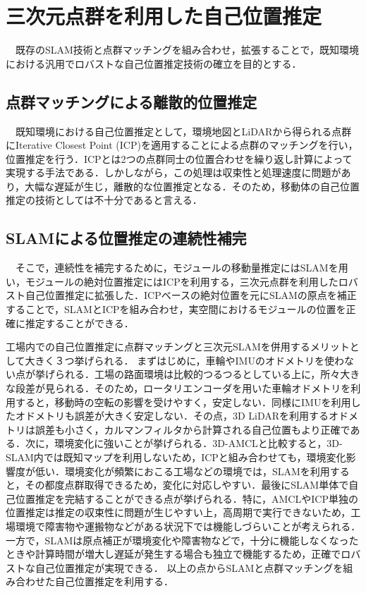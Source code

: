 \section{三次元点群を利用した自己位置推定}
\label{sec:self_position}
　既存のSLAM技術\cite{6DSLAM_outside, 3D_SLAM_outside, EKF_SLAM, FAST-LIO, FAST-LIO2}と点群マッチングを組み合わせ，拡張することで，既知環境における汎用でロバストな自己位置推定技術の確立を目的とする．

\subsection{点群マッチングによる離散的位置推定}
　既知環境における自己位置推定として，環境地図とLiDARから得られる点群にIterative Closest Point (ICP)\cite{ICP}を適用することによる点群のマッチングを行い，位置推定を行う．ICPとは2つの点群同士の位置合わせを繰り返し計算によって実現する手法である．しかしながら，この処理は収束性と処理速度に問題があり，大幅な遅延が生じ，離散的な位置推定となる．そのため，移動体の自己位置推定の技術としては不十分であると言える．

\subsection{SLAMによる位置推定の連続性補完}
　そこで，連続性を補完するために，モジュールの移動量推定にはSLAMを用い，モジュールの絶対位置推定にはICPを利用する，三次元点群を利用したロバスト自己位置推定に拡張した．ICPベースの絶対位置を元にSLAMの原点を補正することで，SLAMとICPを組み合わせ，実空間におけるモジュールの位置を正確に推定することができる．

工場内での自己位置推定に点群マッチングと三次元SLAMを併用するメリットとして大きく３つ挙げられる．
まずはじめに，車輪やIMUのオドメトリを使わない点が挙げられる．工場の路面環境は比較的つるつるとしている上に，所々大きな段差が見られる．そのため，ロータリエンコーダを用いた車輪オドメトリを利用すると，移動時の空転の影響を受けやすく，安定しない．同様にIMUを利用したオドメトリも誤差が大きく安定しない．その点，3D LiDARを利用するオドメトリは誤差も小さく，カルマンフィルタから計算される自己位置もより正確である．次に，環境変化に強いことが挙げられる．3D-AMCL\cite{3d-AMCL}と比較すると，3D-SLAM内では既知マップを利用しないため，ICPと組み合わせても，環境変化影響度が低い．環境変化が頻繁におこる工場などの環境では，SLAMを利用すると，その都度点群取得できるため，変化に対応しやすい．最後にSLAM単体で自己位置推定を完結することができる点が挙げられる．特に，AMCLやICP単独の位置推定は推定の収束性に問題が生じやすい上，高周期で実行できないため，工場環境で障害物や運搬物などがある状況下では機能しづらいことが考えられる．一方で，SLAMは原点補正が環境変化や障害物などで，十分に機能しなくなったときや計算時間が増大し遅延が発生する場合も独立で機能するため，正確でロバストな自己位置推定が実現できる．
以上の点からSLAMと点群マッチングを組み合わせた自己位置推定を利用する．

